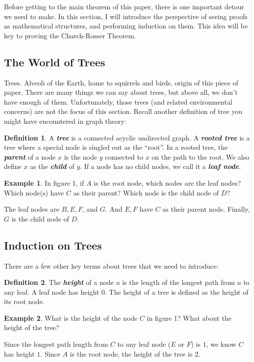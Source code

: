 \documentclass[a4paper,11pt]{article}
\theoremstyle{definition}
\newtheorem{definition}{Definition}[section]
\theoremstyle{example}
\newtheorem*{example}{Example}
\theoremstyle{lemma}
\begin{document}
Before getting to the main theorem of this paper, there is one important detour we need to make. In this section, I will introduce the perspective of seeing proofs as mathematical structures, and performing induction on them. This idea will be key to proving the Church-Rosser Theorem.

\subsection{The World of Trees}
Trees. Alveoli of the Earth, home to squirrels and birds, origin of this piece of paper. There are many things we can say about trees, but above all, we don't have enough of them. Unfortunately, those trees (and related environmental concerns) are not the focus of this section. Recall another definition of tree you might have encountered in graph theory:
\begin{definition}
A \textbf{\textit{tree}} is a connected acyclic undirected graph. A \textbf{\textit{rooted tree}} is a tree where a special node is singled out as the ``root''. In a rooted tree, the \textbf{\textit{parent}} of a node $x$ is the node $y$ connected to $x$ on the path to the root. We also define $x$ as the \textbf{\textit{child}} of $y$. If a node has no child nodes, we call it a \textbf{\textit{leaf node}}.
\end{definition}

\begin{example}
In figure 1, if $A$ is the root node, which nodes are the leaf nodes? Which node(s) have $C$ as their parent? Which node is the child node of $D$?
\end{example}
The leaf nodes are $B, E, F$, and $G$. And $E, F$ have $C$ as their parent node. Finally, $G$ is the child node of $D$.

\subsection{Induction on Trees}
There are a few other key terms about trees that we need to introduce:
\begin{definition}
The \textbf{\textit{height}} of a node $u$ is the length of the longest path from $u$ to any leaf. A leaf node has height $0$. The height of a tree is defined as the height of its root node.
\end{definition}
\begin{example}
What is the height of the node $C$ in figure 1? What about the height of the tree?
\end{example}
Since the longest path length from $C$ to any leaf node ($E$ or $F$) is $1$, we know $C$ has height $1$. Since $A$ is the root node, the height of the tree is $2$.
\end{document}
